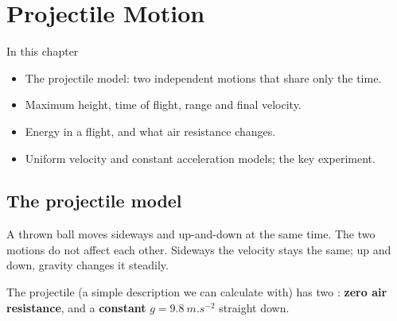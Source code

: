 \chapter{Projectile Motion}\label{ch1:chap}

\begin{summarybox}{In this chapter}
\begin{itemize}
  \item The projectile model: two independent motions that share only the time.
  \item Maximum height, time of flight, range and final velocity.
  \item Energy in a flight, and what air resistance changes.
  \item Uniform velocity and constant acceleration models; the key experiment.
\end{itemize}
\end{summarybox}

\section{The projectile model}\label{ch1:sec:model}

\begin{bigidea}
A thrown ball moves sideways and up-and-down at the same time. The two motions do not affect
each other. Sideways the velocity stays the same; up and down, gravity changes it steadily.
\end{bigidea}

\begin{keywords}
\end{keywords}

The projectile  (a simple description we can calculate with) has two
: \textbf{zero air resistance}, and a \textbf{constant} $g = \qty{9.8}{m.s^{-2}}$
straight down.

